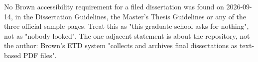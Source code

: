 
%

%

%
%
\thesissetchapteropening{2in}

%
	{No Brown accessibility requirement for a filed dissertation was found on
	 2026-09-14, in the Dissertation Guidelines, the Master's Thesis Guidelines
	 or any of the three official sample pages. Treat this as "this graduate
	 school asks for nothing", not as "nobody looked". The one adjacent
	 statement is about the repository, not the author: Brown's ETD system
	 "collects and archives final dissertations as text-based PDF files".}

